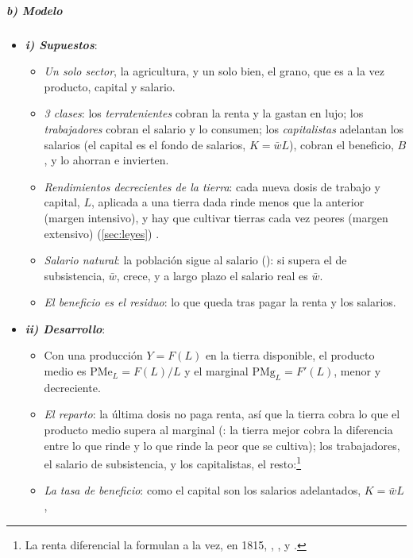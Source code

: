\documentclass[11pt]{article}
\begin{document}
\subparagraph{b) Modelo}
\begin{itemize}
\item \textbf{\emph{i) Supuestos}}:
  \begin{itemize}
  \item \emph{Un solo sector}, la agricultura, y un solo bien, el grano, que es a la vez producto, capital y salario.
  \item \emph{3 clases}: los \emph{terratenientes} cobran la renta y la gastan en lujo; los \emph{trabajadores} cobran el salario y lo consumen; los \emph{capitalistas} adelantan los salarios (el capital es el fondo de salarios, $K=\bar w L$), cobran el beneficio, $B$, y lo ahorran e invierten.
  \item \emph{Rendimientos decrecientes de la tierra}: cada nueva dosis de trabajo y capital, $L$, aplicada a una tierra dada rinde menos que la anterior (margen intensivo), y hay que cultivar tierras cada vez peores (margen extensivo) (\ref{sec:leyes}) .
  \item \emph{Salario natural}: la población sigue al salario (): si supera el de subsistencia, $\bar w$, crece, y a largo plazo el salario real es $\bar w$.
  \item \emph{El beneficio es el residuo}: lo que queda tras pagar la renta y los salarios.
  \end{itemize}
\item \textbf{\emph{ii) Desarrollo}}:
  \begin{itemize}
  \item Con una producción $Y=F(L)$ en la tierra disponible, el producto medio es $\mathrm{PMe}_L=F(L)/L$ y el marginal $\mathrm{PMg}_L=F'(L)$, menor y decreciente.
  \item \emph{El reparto}: la última dosis no paga renta, así que la tierra cobra lo que el producto medio supera al marginal (: la tierra mejor cobra la diferencia entre lo que rinde y lo que rinde la peor que se cultiva); los trabajadores, el salario de subsistencia, y los capitalistas, el resto:\footnote{La renta diferencial la formulan a la vez, en 1815, \textcite{West1815Essay}, \textcite{Malthus1815Rent}, \textcite{Torrens1815Essay} y \textcite{Ricardo1815Essay}.}
  \item \emph{La tasa de beneficio}: como el capital son los salarios adelantados, $K=\bar w L$,

\end{itemize}
\end{itemize}
\end{document}
